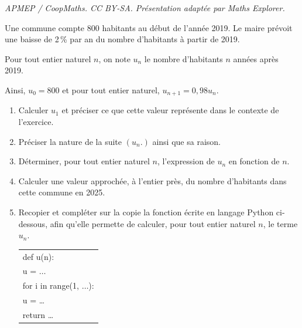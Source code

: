 \documentclass[10pt]{article}
\begin{document}
\noindent\textit{APMEP / CoopMaths. CC BY-SA. Présentation adaptée par Maths Explorer.}\par\medskip
\medskip

Une commune compte $800$ habitants au début de l'année 2019. Le maire prévoit une baisse de 2\,\% par an du nombre d'habitants à partir de 2019.

Pour tout entier naturel $n$, on note $u_n$ le nombre d'habitants $n$ années après 2019. 

Ainsi, $u_0 = 800$ et pour tout entier naturel, $u_{n+1}= 0,98u_n$.

\medskip

\begin{enumerate}
\item Calculer $u_1$ et préciser ce que cette valeur représente dans le contexte de l'exercice.
\item Préciser la nature de la suite $\left(u_n.\right)$ ainsi que sa raison.
\item Déterminer, pour tout entier naturel $n$, l'expression de $u_n$ en fonction de $n$.
\item Calculer une valeur approchée, à l'entier près, du nombre d'habitants dans cette commune en 2025.
\item Recopier et compléter sur la copie la fonction écrite en langage Python ci-dessous, afin qu'elle permette de calculer, pour tout entier naturel $n$, le terme $u_n$.

\begin{center}
\begin{tabular}[]{|l|}
\hline
def u(n):\\ 
\hspace{1.3em}	u = $\dots$\\
\hspace{1.3em}	for i in range(1, $\dots$):\\
\hspace{2.8em}  u = \dots \\
\hspace{1.3em}return \dots\\
\hline
\end{tabular}
\end{center}
\end{enumerate}

\vspace{0,5cm}
\end{document}
